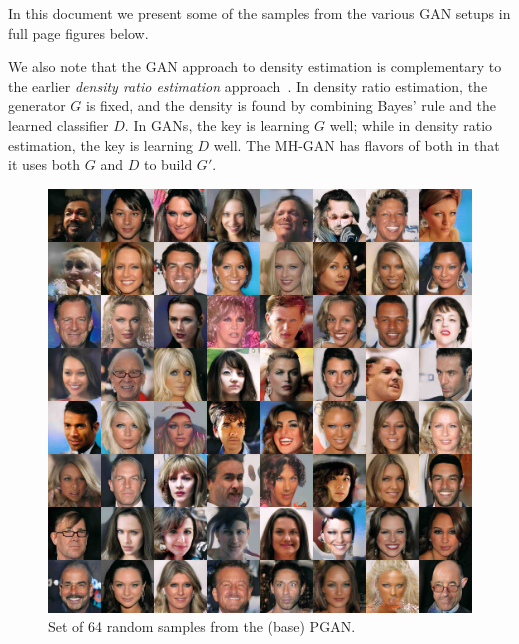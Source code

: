In this document we present some of the samples from the various GAN setups in full page figures below.

We also note that the GAN approach to density estimation is complementary to the earlier \emph{density ratio estimation} approach~\citep{Sugiyama2012}\@.
In density ratio estimation, the generator $G$ is fixed, and the density is found by combining Bayes' rule and the learned classifier $D$.
In GANs, the key is learning $G$ well; while in density ratio estimation, the key is learning $D$ well.
The MH-GAN has flavors of both in that it uses both $G$ and $D$ to build $G'$.

\begin{figure}[htbp]
    \centering
    \includegraphics[width=\exfactor\textwidth]{figures/pgan/all_base_iso_base_lq.jpg}
    \caption{
    Set of 64 random samples from the (base) PGAN\@.
    }
    \label{fig:PGAN samples}
\end{figure}


